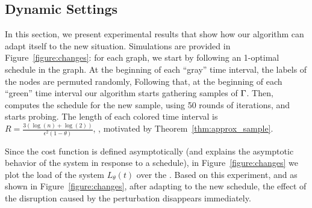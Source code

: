 
\subsection{Dynamic Settings}\label{sec:dynset}
In this section, we present experimental results that show
 how our algorithm can adapt itself to the new situation.
Simulations are provided in Figure~\ref{figure:changes}: for each graph, we
start by following an 1-optimal schedule in the graph. At the beginning of each
``gray'' time interval, the labels of the nodes are permuted randomly,  Following that, at
the beginning of each ``green'' time interval our algorithm starts gathering
samples of $\Gamma$. Then, \algonameapx computes the schedule for the new sample, using 50 rounds of iterations, and starts probing. The length of each colored time
interval is $R = \frac{3(\log(n)+\log(2))}{\epsilon^2(1-\theta)}$, , motivated by
Theorem~\ref{thm:approx_sample}.



Since the cost function is defined asymptotically (and explains the asymptotic behavior of the system in response to a schedule), in  Figure~\ref{figure:changes} we plot the load of the system $L_\theta(t)$ over the . Based on this experiment, and as shown in Figure~\ref{figure:changes}, after adapting to the new schedule, the effect of the disruption caused by the perturbation disappears immediately. 

